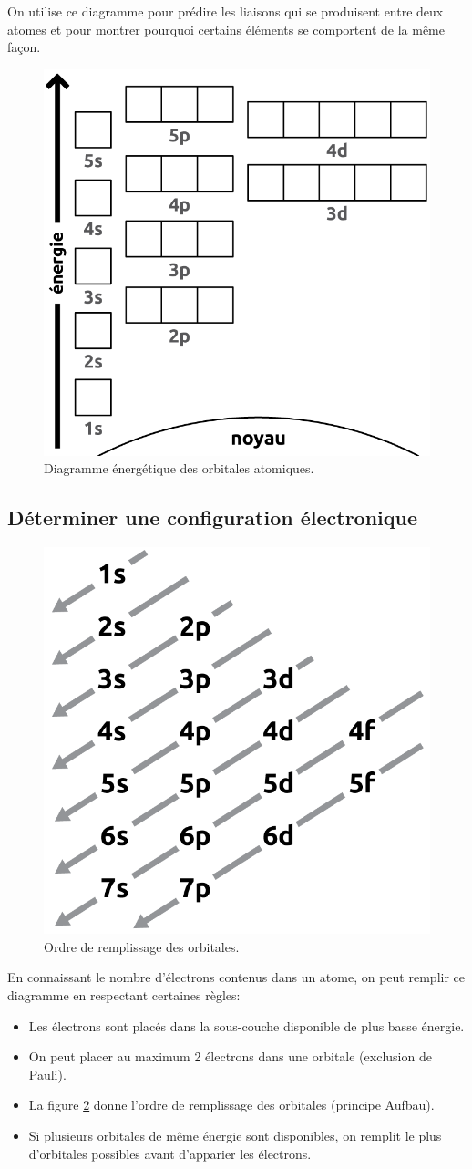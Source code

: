 \documentclass[
  11pt,
  french,
  a4paper,
  openany]{book}
\providecommand{\tightlist}{%
  \setlength{\itemsep}{0pt}\setlength{\parskip}{0pt}}
\begin{document}
On utilise ce diagramme pour prédire les liaisons qui se produisent entre deux atomes et pour montrer pourquoi certains éléments se comportent de la même façon.

\begin{figure}

{\centering \includegraphics[width=0.4\linewidth]{images/energy-level} 

}

\caption{Diagramme énergétique des orbitales atomiques.}\label{fig:energy-level}
\end{figure}

\newpage

\hypertarget{duxe9terminer-une-configuration-uxe9lectronique}{%
\subsection{Déterminer une configuration électronique}\label{duxe9terminer-une-configuration-uxe9lectronique}}

\begin{figure}

{\centering \includegraphics[width=0.25\linewidth]{images/energy-level-order} 

}

\caption{Ordre de remplissage des orbitales.}\label{fig:energy-level-order}
\end{figure}

En connaissant le nombre d'électrons contenus dans un atome, on peut remplir ce diagramme en respectant certaines règles:

\begin{itemize}
\tightlist
\item
  Les électrons sont placés dans la sous-couche disponible de plus basse énergie.
\item
  On peut placer au maximum 2 électrons dans une orbitale (exclusion de Pauli).
\item
  La figure \ref{fig:energy-level-order} donne l'ordre de remplissage des orbitales (principe Aufbau).
\item
  Si plusieurs orbitales de même énergie sont disponibles, on remplit le plus d'orbitales possibles avant d'apparier les électrons.
\end{itemize}
\end{document}
